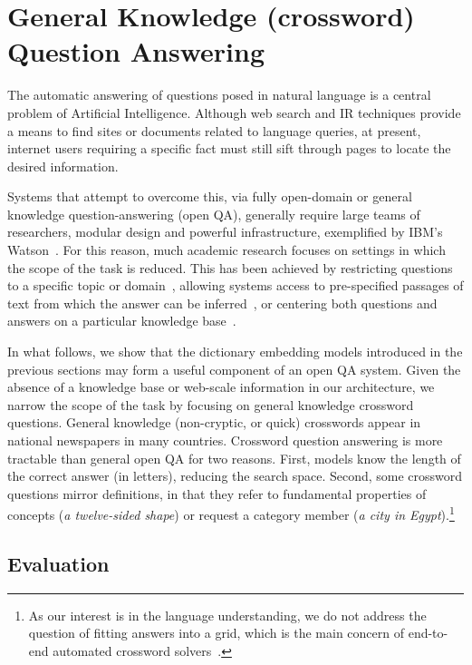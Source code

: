 \documentclass[11pt,letterpaper]{article}
\begin{document}
\section{General Knowledge (crossword) Question Answering}

The automatic answering of questions posed in natural language is a central problem of Artificial Intelligence. Although web search and IR techniques provide a means to find sites or documents related to language queries, at present, internet users requiring a specific fact must still sift through pages to locate the desired information. 

Systems that attempt to overcome this, via fully open-domain or general knowledge question-answering (open QA), generally require large teams of researchers, modular design and powerful infrastructure, exemplified by IBM's Watson~\cite{ferrucci2010building}. For this reason, much academic research focuses on settings in which the scope of the task is reduced. This has been achieved by restricting questions to a specific topic or domain~\cite{molla2007question}, allowing systems access to pre-specified passages of text from which the answer can be inferred~\cite{Iyyer:Boyd-Graber:Claudino:Socher:Daume-2014,weston2015towards}, or centering both questions and answers on a particular knowledge base~\cite{berant14paraphrasing,bordes2014question}. 

In what follows, we show that the dictionary embedding models introduced in the previous sections may form a useful component of an open QA system. Given the absence of a knowledge base or web-scale information in our architecture, we narrow the scope of the task by focusing on general knowledge crossword questions. General knowledge (non-cryptic, or quick) crosswords appear in national newspapers in many countries. Crossword question answering is more tractable than general open QA for two reasons. First, models know the length of the correct answer (in letters), reducing the search space. Second, some crossword questions mirror definitions, in that they refer to fundamental properties of concepts (\emph{a twelve-sided shape}) or request a category member (\emph{a city in Egypt}).\footnote{As our interest is in the language understanding, we do not address the question of fitting answers into a grid, which is the main concern of end-to-end automated crossword solvers~\cite{littman2002probabilistic}.} 

\subsection{Evaluation} 
\end{document}
